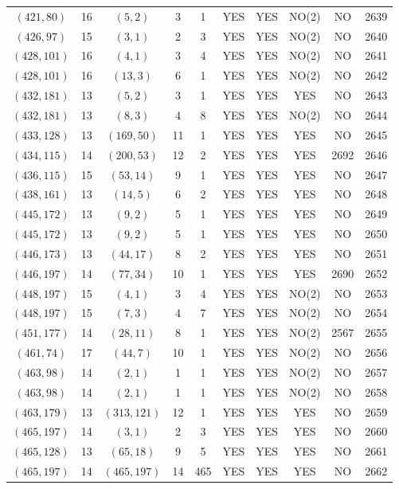 \begin{longtable}{|c|c|c|c|c|c|c|c|c|c|}
$(421, 80)$ & 16 & $(5, 2)$ & 3 & 1 & YES & YES & NO(2) & NO & 2639\\
$(426, 97)$ & 15 & $(3, 1)$ & 2 & 3 & YES & YES & NO(2) & NO & 2640\\
$(428, 101)$ & 16 & $(4, 1)$ & 3 & 4 & YES & YES & NO(2) & NO & 2641\\
$(428, 101)$ & 16 & $(13, 3)$ & 6 & 1 & YES & YES & NO(2) & NO & 2642\\
$(432, 181)$ & 13 & $(5, 2)$ & 3 & 1 & YES & YES & YES & NO & 2643\\
$(432, 181)$ & 13 & $(8, 3)$ & 4 & 8 & YES & YES & NO(2) & NO & 2644\\
$(433, 128)$ & 13 & $(169, 50)$ & 11 & 1 & YES & YES & YES & NO & 2645\\
$(434, 115)$ & 14 & $(200, 53)$ & 12 & 2 & YES & YES & YES & 2692 & 2646\\
$(436, 115)$ & 15 & $(53, 14)$ & 9 & 1 & YES & YES & YES & NO & 2647\\
$(438, 161)$ & 13 & $(14, 5)$ & 6 & 2 & YES & YES & YES & NO & 2648\\
$(445, 172)$ & 13 & $(9, 2)$ & 5 & 1 & YES & YES & YES & NO & 2649\\
$(445, 172)$ & 13 & $(9, 2)$ & 5 & 1 & YES & YES & YES & NO & 2650\\
$(446, 173)$ & 13 & $(44, 17)$ & 8 & 2 & YES & YES & YES & NO & 2651\\
$(446, 197)$ & 14 & $(77, 34)$ & 10 & 1 & YES & YES & YES & 2690 & 2652\\
$(448, 197)$ & 15 & $(4, 1)$ & 3 & 4 & YES & YES & NO(2) & NO & 2653\\
$(448, 197)$ & 15 & $(7, 3)$ & 4 & 7 & YES & YES & NO(2) & NO & 2654\\
$(451, 177)$ & 14 & $(28, 11)$ & 8 & 1 & YES & YES & NO(2) & 2567 & 2655\\
$(461, 74)$ & 17 & $(44, 7)$ & 10 & 1 & YES & YES & NO(2) & NO & 2656\\
$(463, 98)$ & 14 & $(2, 1)$ & 1 & 1 & YES & YES & NO(2) & NO & 2657\\
$(463, 98)$ & 14 & $(2, 1)$ & 1 & 1 & YES & YES & NO(2) & NO & 2658\\
$(463, 179)$ & 13 & $(313, 121)$ & 12 & 1 & YES & YES & YES & NO & 2659\\
$(465, 197)$ & 14 & $(3, 1)$ & 2 & 3 & YES & YES & YES & NO & 2660\\
$(465, 128)$ & 13 & $(65, 18)$ & 9 & 5 & YES & YES & YES & NO & 2661\\
$(465, 197)$ & 14 & $(465, 197)$ & 14 & 465 & YES & YES & YES & NO & 2662\\

\end{longtable}
